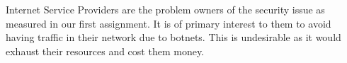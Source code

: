 Internet Service Providers are the problem owners of the security issue as measured in our first assignment. It is of primary interest to them to avoid having traffic in their network due to botnets. This is undesirable as it would exhaust their resources and cost them money.